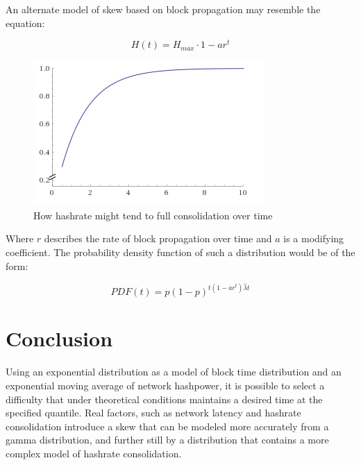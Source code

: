 \documentclass[]{article}
\begin{document}
An alternate model of skew based on block propagation may resemble the equation: 

\begin{equation}
	H(t) = H_{max} \cdot 1 - ar^t
\end{equation}

\begin{figure}[h]
	\centering
	\includegraphics[width=0.7\linewidth]{"./hashpower ramp"}
	\caption{\footnotesize How hashrate might tend to full consolidation over time \cite{Wolfram}}
\end{figure}

\pagebreak

Where $r$ describes the rate of block propagation over time and $a$ is a modifying coefficient. The probability density function of such a distribution would be of the form: 

\begin{equation}
PDF(t) = p(1 - p)^{t(1 - ar^t)\hat{\lambda} t}
\end{equation}

\section{Conclusion}
Using an exponential distribution as a model of block time distribution and an exponential moving average of network hashpower, it is possible to select a difficulty that under theoretical conditions maintains a desired time at the specified quantile.  Real factors, such as network latency and hashrate consolidation introduce a skew that can be modeled more accurately from a gamma distribution, and further still by a distribution that contains a more complex model of hashrate consolidation. 



\end{document}
